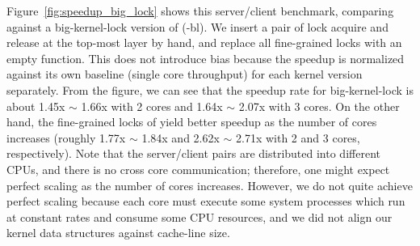 Figure~\ref{fig:speedup_big_lock} shows this server/client benchmark,
comparing {\cCTOS} against a big-kernel-lock version of {\cCTOS}
({\cCTOS-bl}). We insert a pair of lock acquire and release at the
top-most layer by hand, and replace all fine-grained locks with an
empty function. This does not introduce bias because the speedup is
normalized against its own baseline (single core throughput) for each
kernel version separately. From the figure, we can see that the
speedup rate for big-kernel-lock is about 1.45x $\sim$ 1.66x with 2
cores and 1.64x $\sim$ 2.07x with 3 cores. On the other hand, the
fine-grained locks of {\cCTOS} yield better speedup as the number of
cores increases (roughly 1.77x $\sim$ 1.84x and 2.62x $\sim$ 2.71x
with 2 and 3 cores, respectively). Note that the server/client pairs
are distributed into different CPUs, and there is no cross core
communication; therefore, one might expect perfect scaling as the
number of cores increases.  However, we do not quite achieve perfect
scaling because each core must execute some system processes which run
at constant rates and consume some CPU resources, and we did not align
our kernel data structures against cache-line size.



